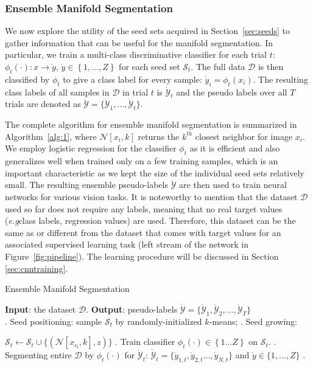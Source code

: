 \documentclass{bmvc2k}
\newlength\myindent
\newcommand\bindent{%
  \begingroup
  \setlength{\itemindent}{\myindent}
  \addtolength{\algorithmicindent}{\myindent}
}
\newcommand\eindent{\endgroup}
\newcommand{\braces}[1]{\left\{ #1 \right\}}
\def\eg{\emph{e.g}\bmvaOneDot}
\begin{document}
\subsubsection{Ensemble Manifold Segmentation} 

We now explore the utility of the seed sets acquired in 
Section~\ref{sec:seeds} to gather information that can be useful for 
the manifold segmentation.  In particular, we train a multi-class 
discriminative classifier for each trial $t$: $\phi_t(\cdot): x 
\rightarrow \dot{y}$,  $\dot{y} \in \braces{1, \ldots, Z}$ for each 
seed set $\mathcal{S}_t$. The full data $\mathcal{D}$ is then classified 
by $\phi_t$ to give a class label for every sample: $\dot{y}_i = 
\phi_t(x_i)$.  The resulting class labels of all samples in $\mathcal{D}$ 
in trial $t$ is $\dot{\mathcal{Y}}_t$ and the pseudo labels over all $T$ 
trials are denoted as $\dot{\mathcal{Y}}=\{ \dot{\mathcal{Y}}_1, ..., 
\dot{\mathcal{Y}}_t\}$.  

The complete algorithm for ensemble manifold segmentation is summarized
in Algorithm~\ref{alg:1}, where $\mathcal{N}[x_i, k]$ returns the
$k^{th}$ closest neighbor for image $x_i$. We
employ logistic regression for the classifier $\phi_t$ as it is 
efficient and also generalizes well when trained only on a few
training samples, which is an important characteristic as we kept the
size of the individual seed sets relatively small. The resulting ensemble
pseudo-labels $\dot{\mathcal{Y}}$ are then used to train neural
networks for various vision tasks. It is noteworthy to mention that 
the dataset $\mathcal{D}$ used so far does not require any labels, meaning
that no real target values (\eg class labels, regression values) are 
used. Therefore, this dataset can be the same as or different from 
the dataset that comes with target values for an associated supervised 
learning task (left stream of the network in Figure~\ref{fig:pipeline}).  
The learning procedure will be discussed in Section \ref{sec:cnntraining}. 


\begin{algorithm}[tb]
\caption{Ensemble Manifold Segmentation}
\label{alg:1}
\begin{algorithmic}
\STATE \textbf{Input}: the dataset $\mathcal{D}$.
\STATE \textbf{Output}: pseudo-labels $\dot{\mathcal{Y}}=\{\dot{\mathcal{Y}}_1, \dot{\mathcal{Y}}_2, ..., \dot{\mathcal{Y}}_T\}$   \\
    . Seed positioning: sample $\mathcal{S}_t$ by randomly-initialized $k$-means;
    . Seed growing: \\ 
    \bindent 
           \STATE $\mathcal{S}_t  \leftarrow  \mathcal{S}_t \cup \{ (\mathcal{N}[x_{c_l},k],z)  \}$
        \ENDFOR
    \ENDFOR
    \eindent 
    . Train classifier $\phi_t(\cdot) \in \braces{1\ldots Z}$ on $\mathcal{S}_t$.
    . Segmenting entire $\mathcal{D}$ by $\phi_t(\cdot)$ for $\dot{\mathcal{Y}}_t$: 
    \bindent \STATE $\dot{\mathcal{Y}}_t = \{ \dot{y}_{1,t},  \dot{y}_{2,t}..., \dot{y}_{N,t} \}$ and $\dot{y} \in \{1,...,Z\}$ .    \eindent
\ENDFOR
\end{algorithmic}
\end{algorithm}
\end{document}
